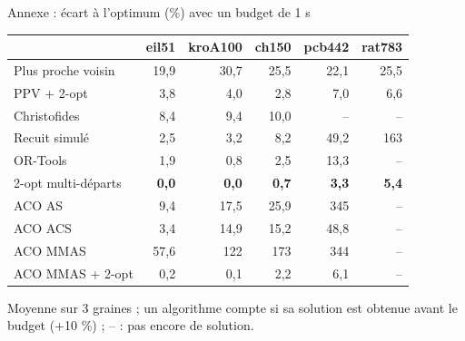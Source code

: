 \documentclass[aspectratio=169,11pt]{beamer}
\newcommand{\bon}[1]{\textcolor{acogreen}{\textbf{#1}}}
\begin{document}
\begin{frame}{Annexe : écart à l'optimum (\%) avec un budget de 1 s}
  \centering
  \footnotesize
  \begin{tabular}{lrrrrr}
    \toprule
    & eil51 & kroA100 & ch150 & pcb442 & rat783 \\
    \midrule
    Plus proche voisin     & 19,9 & 30,7 & 25,5 & 22,1 & 25,5 \\
    PPV + 2-opt            & 3,8 & 4,0 & 2,8 & 7,0 & 6,6 \\
    Christofides           & 8,4 & 9,4 & 10,0 & -- & -- \\
    Recuit simulé          & 2,5 & 3,2 & 8,2 & 49,2 & 163 \\
    OR-Tools               & 1,9 & 0,8 & 2,5 & 13,3 & -- \\
    2-opt multi-départs    & \bon{0,0} & \bon{0,0} & \bon{0,7} & \bon{3,3} & \bon{5,4} \\
    \midrule
    ACO AS                 & 9,4 & 17,5 & 25,9 & 345 & -- \\
    ACO ACS                & 3,4 & 14,9 & 15,2 & 48,8 & -- \\
    ACO MMAS               & 57,6 & 122 & 173 & 344 & -- \\
    ACO MMAS + 2-opt       & 0,2 & 0,1 & 2,2 & 6,1 & -- \\
    \bottomrule
  \end{tabular}

  \vspace{0.4em}
  \raggedright\footnotesize
  Moyenne sur 3 graines ; un algorithme compte si sa solution est obtenue avant le budget (+10 \%) ;
  -- : pas encore de solution.
\end{frame}
\end{document}
